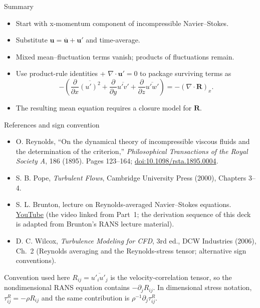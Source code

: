 \documentclass[aspectratio=169,11pt]{beamer}
\newcommand{\uu}{\bm{u}}
\newcommand{\avg}[1]{\overline{#1}}
\renewcommand{\up}{\uu'} %
\newcommand{\ubar}{\avg{\uu}}
\newcommand{\Div}{\nabla\cdot}
\begin{document}
\begin{frame}{Summary}
\begin{itemize}
  \item Start with x-momentum component of incompressible Navier--Stokes.
  \item Substitute $\uu=\ubar+\up$ and time-average.
  \item Mixed mean--fluctuation terms vanish; products of fluctuations remain.
  \item Use product-rule identities + $\Div\up=0$ to package surviving terms as
  \[
  -\left(\frac{\partial}{\partial x}\avg{(u')^2}+\frac{\partial}{\partial y}\avg{u'v'}+\frac{\partial}{\partial z}\avg{u'w'}\right)
  = -(\Div \bm{R})_x.
  \]
  \item The resulting mean equation requires a closure model for $\bm{R}$.
\end{itemize}
\end{frame}

\begin{frame}{References and sign convention}
\small
\begin{itemize}
  \item O. Reynolds, ``On the dynamical theory of incompressible viscous fluids and the determination of the criterion,'' \emph{Philosophical Transactions of the Royal Society A}, 186 (1895).
  Pages 123--164; \href{https://doi.org/10.1098/rsta.1895.0004}{doi:10.1098/rsta.1895.0004}.
  \item S. B. Pope, \emph{Turbulent Flows}, Cambridge University Press (2000), Chapters 3--4.
  \item S. L. Brunton, lecture on Reynolds-averaged Navier--Stokes equations.
  \href{https://www.youtube.com/watch?v=mDt-HJEXK6g}{YouTube} (the video linked from Part~1; the derivation sequence of this deck is adapted from Brunton's RANS lecture material).
  \item D. C. Wilcox, \emph{Turbulence Modeling for CFD}, 3rd ed., DCW Industries (2006), Ch.~2 (Reynolds averaging and the Reynolds-stress tensor; alternative sign conventions).
\end{itemize}

\begin{block}{Convention used here}
$R_{ij}=\overline{u'_i u'_j}$ is the velocity-correlation tensor, so the nondimensional RANS equation contains $-\partial_jR_{ij}$. In dimensional stress notation, $\tau^R_{ij}=-\rho R_{ij}$ and the same contribution is $\rho^{-1}\partial_j\tau^R_{ij}$.
\end{block}
\end{frame}
\end{document}
